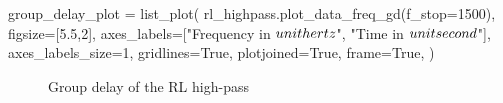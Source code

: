 \begin{sagesilent}
    group_delay_plot = list_plot(
        rl_highpass.plot_data_freq_gd(f_stop=1500),
        figsize=[5.5,2],
        axes_labels=["Frequency in $\\unit{\\hertz}$", "Time in $\\unit{\\second}$"],
        axes_labels_size=1,
        gridlines=True,
        plotjoined=True,
        frame=True,
    )
\end{sagesilent}

\begin{figure}[H]
    \centering
    \caption{Group delay of the RL high-pass}
\end{figure}